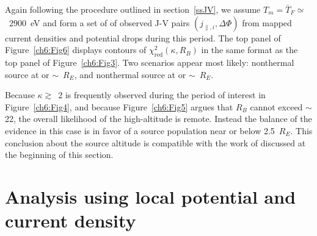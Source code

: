   Again following the procedure outlined in section~\ref{ssJV}, we assume
  $T_m = \bar{T}_F \simeq$~2900~eV and form a set of of observed J-V pairs
  $( j_{\parallel,i} , \Delta \Phi )$ from mapped current densities and
  potential drops during this period. The top panel of Figure~\ref{ch6:Fig6}
  displays contours of $\chi^2_{\textrm{red}} ( \kappa, R_B )$ in the same
  format as the top panel of Figure~\ref{ch6:Fig3}. Two scenarios \DIFaddbegin {}\DIFaddend appear
  most likely: \DIFdelbegin {}\DIFdelend \DIFaddbegin {}\DIFaddend nonthermal source at or \DIFdelbegin {}\DIFdelend \DIFaddbegin {}\DIFaddend $\sim$\DIFdelbegin {}\DIFdelend \DIFaddbegin {}\DIFaddend ~$R_E$, and \DIFdelbegin {}\DIFdelend \DIFaddbegin {}\DIFaddend nonthermal source at or \DIFdelbegin {}\DIFdelend \DIFaddbegin {}\DIFaddend $\sim$\DIFdelbegin {}\DIFdelend \DIFaddbegin {}\DIFaddend ~$R_E$.

  Because $\kappa \gtrsim$~2 is frequently observed during the period of
  interest in Figure~\ref{ch6:Fig4}, and because Figure~\ref{ch6:Fig5} argues
  that $R_B$ cannot exceed $\sim$22, the overall likelihood of the \DIFdelbegin {}\DIFdelend high-altitude
  \DIFdelbegin {}\DIFdelend \DIFaddbegin {}\DIFaddend is remote. Instead \DIFdelbegin \DIFdel{, }\DIFdelend the balance of the evidence in this case is in
  favor of a \DIFdelbegin {}\DIFdelend \DIFaddbegin {}\DIFaddend source population near
  \DIFaddbegin {}\DIFaddend or below 2.5~$R_E$. This conclusion about the
  source altitude is compatible with the work of \citet{Ergun1998} discussed at
  the beginning of this section.

  \section{Analysis using local potential and current density}


